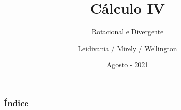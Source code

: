 \documentclass[serif]{beamer}
\title{Cálculo IV}
\subtitle{Rotacional e Divergente}
\author{Leidivania / Mirely / Wellington}
\institute[]{Instituto Federal de Ciência e Tecnologia do Ceará - IFCE}
\date{Agosto - 2021}
\begin{document}
\frame{\titlepage}
\begin{frame}
    \frametitle{Índice}
    \tableofcontents
\end{frame}






\end{document}
